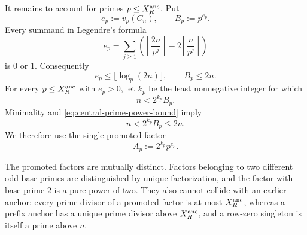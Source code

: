 \documentclass[11pt]{article}
\numberwithin{equation}{section}
\theoremstyle{definition}
\theoremstyle{remark}
\newcommand{\1}{\mathbf 1}
\begin{document}
It remains to account for primes \(p\le X_R^{\rm anc}\).  Put
\[
             e_p:=v_p(C_n),\qquad B_p:=p^{e_p}.
\]
Every summand in Legendre's formula
\begin{equation}
 e_p=\sum_{j\ge1}
 \left(
    \left\lfloor\frac{2n}{p^j}\right\rfloor
    -2\left\lfloor\frac n{p^j}\right\rfloor
 \right)
 \label{eq:residual-central-exponent}
\end{equation}
is \(0\) or \(1\).  Consequently
\begin{equation}
       e_p\le\lfloor\log_p(2n)\rfloor,
       \qquad B_p\le2n.
       \label{eq:central-prime-power-bound}
\end{equation}
For every \(p\le X_R^{\rm anc}\) with \(e_p>0\), let \(k_p\) be the least
nonnegative integer for which
\begin{equation}
                         n<2^{k_p}B_p.
                         \label{eq:promotion-exponent}
\end{equation}
Minimality and \eqref{eq:central-prime-power-bound} imply
\[
                         n<2^{k_p}B_p\le2n.
\]
We therefore use the single promoted factor
\begin{equation}
                         A_p:=2^{k_p}p^{e_p}.
                         \label{eq:promoted-central-factor}
\end{equation}

The promoted factors are mutually distinct.  Factors belonging to two
different odd base primes are distinguished by unique factorization, and
the factor with base prime \(2\) is a pure power of two.  They also cannot
collide with an earlier anchor: every prime divisor of a promoted factor
is at most \(X_R^{\rm anc}\), whereas a prefix anchor has a unique prime divisor
above \(X_R^{\rm anc}\), and a row-zero singleton is itself a prime above \(n\).
\end{document}
